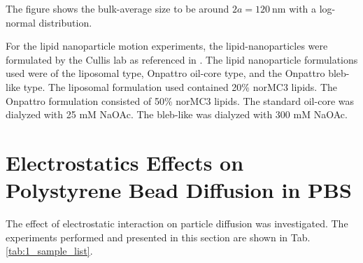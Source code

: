 The figure shows the bulk-average size to be around $2a = \SI{120}{\nm}$ with a log-normal distribution.


For the lipid nanoparticle motion experiments, the lipid-nanoparticles were formulated by the Cullis lab as referenced in \cite{kamanzi_simultaneous_2021, Kulkarni2017}. The lipid nanoparticle formulations used were of the liposomal type, Onpattro oil-core type, and the Onpattro bleb-like type. The liposomal formulation used contained 20\% norMC3 lipids. The Onpattro formulation consisted of 50\% norMC3 lipids. The standard oil-core was dialyzed with 25 mM NaOAc. The bleb-like was dialyzed with 300 mM NaOAc.




\clearpage

\section{Electrostatics Effects on Polystyrene Bead Diffusion in PBS}

The effect of electrostatic interaction on particle diffusion was investigated. The experiments performed and presented in this section are shown in Tab. \ref{tab:1_sample_list}. 

